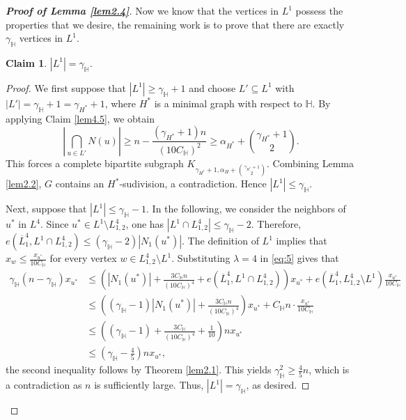 \documentclass[11pt, a4paper]{article}
\newtheorem{claim}[theorem]{Claim}
\theoremstyle{definition}
\newcommand{\<}{\subseteq}
\begin{document}
\begin{proof}[\bf Proof of Lemma \ref{lem2.4}]
Now we know that the vertices in $L^1$ possess the properties that we desire, the remaining work is to prove that there are exactly $\gamma_\mathbb{H}$ vertices in $L^1$.

\begin{claim}\label{lem4.6}
     \( |L^1| = \gamma_\mathbb{H} \).
\end{claim}

\begin{proof}
    We first suppose that \( |L^1| \geq \gamma_\mathbb{H} + 1 \) and choose $L'\subseteq L^1$ with $|L'|=\gamma_\mathbb{H} + 1=\gamma_{H^*} + 1$, where $H^*$ is a minimal graph with respect to $\mathbb{H}$. By applying Claim \ref{lem4.5}, we obtain  %
    \[
    \left|\bigcap_{u \in L'} N(u)\right|\geq n - \frac{(\gamma_{H^*}+1)n}{(10C_\mathbb{H})^2} \geq \alpha_{H^*} + \binom{\gamma_{H^*}+1}{2}.
    \]
    This forces a complete bipartite subgraph \( K_{\gamma_{H^*}+1, \alpha_H + \binom{\gamma_{H^*}+1}{2}} \). Combining  Lemma \ref{lem2.2}, $G$ contains an $H^*$-sudivision, a contradiction. Hence  \( |L^1| \leq \gamma_\mathbb{H}\). 
    
   Next, suppose that $|L^1|\leq \gamma_{\mathbb{H}}-1$. In the following, we consider the neighbors of $u^*$ in $L^4$.  Since  \( u^* \in L^1 \setminus L_{1,2}^4 \), one has $|L^1\cap L_{1,2}^4|\leq \gamma_{\mathbb{H}}-2$. Therefore, $e(\overline{L}_1^4, L^1 \cap L_{1,2}^4) \leq (\gamma_\mathbb{H}-2)|N_1(u^*)|$. 
    The definition of $L^1$ implies that  $x_w\leq \frac{x_{u^*}}{10C_{\mathbb{H}}}$  for every vertex $w\in  L_{1,2}^4\setminus L^1$.  Substituting \( \lambda = 4 \) in \eqref{eq:5} gives that
    \begin{align*}
    \gamma_\mathbb{H}(n-\gamma_\mathbb{H})x_{u^*} &\leq \left(|N_1({u^*})| +  \frac{3C_\mathbb{H}n}{(10C_\mathbb{H})^{4}} +e\left(\overline{L}_1^4,L^1 \cap L_{1,2}^4\right) \right)x_{u^*}+e\left(\overline{L}_1^4,L_{1,2}^4\setminus L^1\right)\frac{x_{u^*}}{10C_{\mathbb{H}}} \\
    &\leq \left((\gamma_{\mathbb{H}}-1)|N_1({u^*})| +  \frac{3C_\mathbb{H}n}{(10C_\mathbb{H})^{4}}\right)x_{u^*}+C_{\mathbb{H}}n\cdot \frac{x_{u^*}}{10C_{\mathbb{H}}}\\
    &\leq \left((\gamma_{\mathbb{H}}-1) +  \frac{3C_\mathbb{H}}{(10C_\mathbb{H})^{4}}+\frac{1}{10}\right)nx_{u^*}\\
    &\leq \left(\gamma_{\mathbb{H}}-\frac{4}{5}\right)nx_{u^*},
\end{align*}
the second inequality follows by Theorem  \ref{lem2.1}. This yields $\gamma_{\mathbb{H}}^2\geq \frac{4}{5}n$, which is a contradiction as $n$ is sufficiently large. Thus, \( |L^1| = \gamma_\mathbb{H} \), as desired.
\end{proof}


\end{proof}
\end{document}
